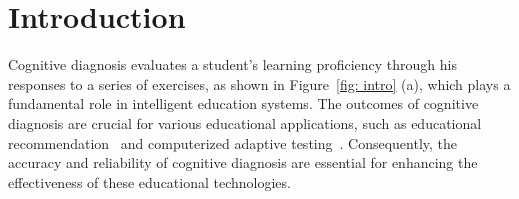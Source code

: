   \section{Introduction}




Cognitive diagnosis evaluates a student's learning proficiency through his responses to a series of exercises, as shown in Figure~\ref{fig: intro} (a), which plays a fundamental role in intelligent education systems. 
The outcomes of cognitive diagnosis are crucial for various educational applications, such as educational recommendation~\cite{huang2019exploring}
and computerized adaptive testing~\cite{bi2020quality,zhuang2022robust}.
Consequently, the accuracy and reliability of cognitive diagnosis are essential for enhancing the effectiveness of these educational technologies.

%

